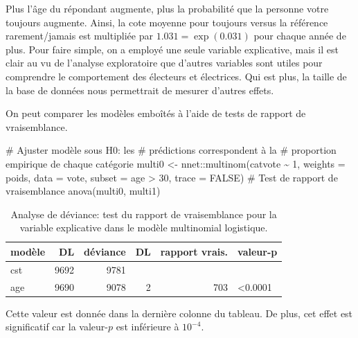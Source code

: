 \documentclass[
  11pt,
  letterpaper,
]{scrbook}
\newenvironment{Shaded}{\begin{snugshade}}{\end{snugshade}}
\newcommand{\AttributeTok}[1]{\textcolor[rgb]{0.40,0.45,0.13}{#1}}
\newcommand{\CommentTok}[1]{\textcolor[rgb]{0.37,0.37,0.37}{#1}}
\newcommand{\ConstantTok}[1]{\textcolor[rgb]{0.56,0.35,0.01}{#1}}
\newcommand{\DecValTok}[1]{\textcolor[rgb]{0.68,0.00,0.00}{#1}}
\newcommand{\FunctionTok}[1]{\textcolor[rgb]{0.28,0.35,0.67}{#1}}
\newcommand{\NormalTok}[1]{\textcolor[rgb]{0.00,0.23,0.31}{#1}}
\newcommand{\OtherTok}[1]{\textcolor[rgb]{0.00,0.23,0.31}{#1}}
\newcommand{\SpecialCharTok}[1]{\textcolor[rgb]{0.37,0.37,0.37}{#1}}
\theoremstyle{definition}
\theoremstyle{remark}
\begin{document}
Plus l'âge du répondant augmente, plus la probabilité que la personne
votre toujours augmente. Ainsi, la cote moyenne pour toujours versus la
référence rarement/jamais est multipliée par \(1.031=\exp(0.031)\) pour
chaque année de plus. Pour faire simple, on a employé une seule variable
explicative, mais il est clair au vu de l'analyse exploratoire que
d'autres variables sont utiles pour comprendre le comportement des
électeurs et électrices. Qui est plus, la taille de la base de données
nous permettrait de mesurer d'autres effets.

On peut comparer les modèles emboîtés à l'aide de tests de rapport de
vraisemblance.

\begin{Shaded}
\begin{Highlighting}[]
\CommentTok{\# Ajuster modèle sous H0: les}
\CommentTok{\# prédictions correspondent à la}
\CommentTok{\# proportion empirique de chaque catégorie}
\NormalTok{multi0 }\OtherTok{\textless{}{-}}\NormalTok{ nnet}\SpecialCharTok{::}\FunctionTok{multinom}\NormalTok{(catvote }\SpecialCharTok{\textasciitilde{}} \DecValTok{1}\NormalTok{,}
                         \AttributeTok{weights =}\NormalTok{ poids,}
                         \AttributeTok{data =}\NormalTok{ vote,}
                         \AttributeTok{subset =}\NormalTok{ age }\SpecialCharTok{\textgreater{}} \DecValTok{30}\NormalTok{,}
                         \AttributeTok{trace =} \ConstantTok{FALSE}\NormalTok{)}
\CommentTok{\# Test de rapport de vraisemblance}
\FunctionTok{anova}\NormalTok{(multi0, multi1)}
\end{Highlighting}
\end{Shaded}

\hypertarget{tbl-anova-multinom}{}
\begin{table}
\caption{\label{tbl-anova-multinom}Analyse de déviance: test du rapport de vraisemblance pour la variable
explicative dans le modèle multinomial logistique. }\tabularnewline

\centering
\begin{tabular}{l|r|r|r|r|l}
\hline
modèle & DL & déviance & DL & rapport vrais. & valeur-p\\
\hline
cst & 9692 & 9781 &  &  & \\
\hline
age & 9690 & 9078 & 2 & 703 & <0.0001\\
\hline
\end{tabular}
\end{table}

Cette valeur est donnée dans la dernière colonne du tableau. De plus,
cet effet est significatif car la valeur-\(p\) est inférieure à
\(10^{-4}\).
\end{document}

